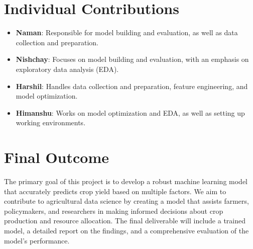 \documentclass[10pt,twocolumn,letterpaper]{article}
\begin{document}
\section{Individual Contributions}

\begin{itemize}
    \item \textbf{Naman}: Responsible for model building and evaluation, as well as data collection and preparation.
    \item \textbf{Nishchay}: Focuses on model building and evaluation, with an emphasis on exploratory data analysis (EDA).
    \item \textbf{Harshil}: Handles data collection and preparation, feature engineering, and model optimization.
    \item \textbf{Himanshu}: Works on model optimization and EDA, as well as setting up working environments.
\end{itemize}

\section{Final Outcome}

The primary goal of this project is to develop a robust machine learning model that accurately predicts crop yield based on multiple factors. We aim to contribute to agricultural data science by creating a model that assists farmers, policymakers, and researchers in making informed decisions about crop production and resource allocation. The final deliverable will include a trained model, a detailed report on the findings, and a comprehensive evaluation of the model's performance.
\end{document}
